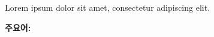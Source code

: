 \begin{abstract*}
  Lorem ipsum dolor sit amet, consectetur adipiscing elit.
\end{abstract*}
\textbf{주요어: }
\vfill

